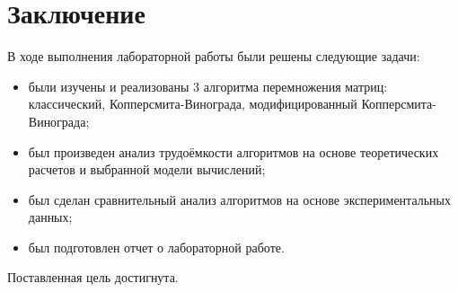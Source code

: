 \chapter*{Заключение}

В ходе выполнения лабораторной работы были решены следующие задачи:

\begin{itemize}
	\item были изучены и реализованы 3 алгоритма перемножения матриц: классический, Копперсмита-Винограда, модифицированный Копперсмита-Винограда;

	\item был произведен анализ трудоёмкости алгоритмов на основе теоретических расчетов и выбранной модели вычислений;
	\item был сделан сравнительный анализ алгоритмов на основе экспериментальных данных;

	\item был подготовлен отчет о лабораторной работе.
\end{itemize}

Поставленная цель достигнута.